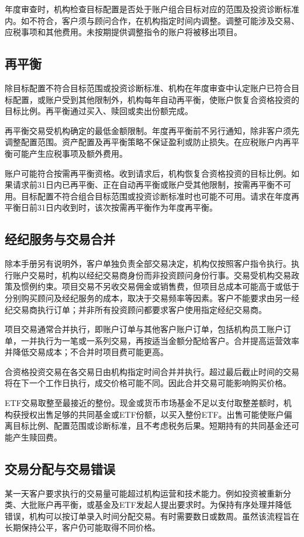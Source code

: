 \documentclass[UTF8,fontset=none,11pt,a4paper]{ctexart}
\begin{document}
年度审查时，机构检查目标配置是否处于账户组合目标对应的范围及投资诊断标准内。如不符合，客户须与顾问合作，在机构指定时间内调整。调整可能涉及交易、应税事项和其他费用。未按期提供调整指令的账户将被移出项目。


\subsection*{再平衡}
除目标配置不符合目标范围或投资诊断标准、机构在年度审查中认定账户已符合目标配置，或账户受到其他限制外，机构每年自动再平衡，使账户恢复合资格投资的目标比例。再平衡通过买入、赎回或卖出份额完成。


再平衡交易受机构确定的最低金额限制。年度再平衡前不另行通知，除非客户须先调整配置范围。资产配置及再平衡策略不保证盈利或防止损失。在应税账户内再平衡可能产生应税事项及额外费用。


账户可能符合按需再平衡资格。收到请求后，机构恢复合资格投资的目标比例。如果请求前31日内已再平衡、正在自动再平衡或账户受其他限制，按需再平衡不可用。目标配置不符合组合目标范围或投资诊断标准时也可能不可用。请求在年度再平衡日前31日内收到时，该次按需再平衡作为年度再平衡。


\subsection*{经纪服务与交易合并}
除本手册另有说明外，客户单独负责全部交易决定，机构仅按照客户指令执行。执行账户交易时，机构以经纪交易商身份而非投资顾问身份行事。交易受机构交易政策及惯例约束。项目交易不另收交易佣金或销售费，但项目总成本可能高于或低于分别购买顾问及经纪服务的成本，取决于交易频率等因素。客户不能要求由另一经纪交易商执行订单；并非所有投资顾问都要求客户使用指定经纪交易商。


项目交易通常合并执行，即账户订单与其他客户账户订单，包括机构员工账户订单，一并执行为一笔或一系列交易，再按适当金额分配给客户。合并提高运营效率并降低交易成本；不合并时项目费可能更高。


合资格投资交易在各交易日由机构指定时间合并并执行。超过最后截止时间的交易将在下一个工作日执行，成交价格可能不同。因此合并交易可能影响购买价格。


ETF交易取整至最接近的整份。现金或货币市场基金不足以支付取整差额时，机构获授权出售足够的共同基金或ETF份额，以买入整份ETF。出售可能使账户偏离目标比例、配置范围或诊断标准，且不考虑税务后果。短期持有的共同基金还可能产生赎回费。


\subsection*{交易分配与交易错误}
某一天客户要求执行的交易量可能超过机构运营和技术能力。例如投资被重新分类、大批账户再平衡，或基金及ETF发起人提出要求时。为保持有序处理并降低错误，机构可以按订单录入时间分配交易。有时需要数日或数周。虽然该流程旨在长期保持公平，客户仍可能取得不同价格。
\end{document}
